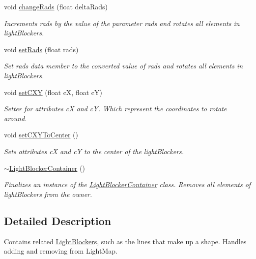 \begin{DoxyCompactItemize}
void \hyperlink{classlighting_1_1LightBlockerContainer_ae6e77185e27fce2e6bf22cdf61f88763}{change\+Rads} (float delta\+Rads)
\begin{DoxyCompactList}\small\item\em Increments rads by the value of the parameter {\itshape rads}  and rotates all elements in light\+Blockers. \end{DoxyCompactList}\item 
void \hyperlink{classlighting_1_1LightBlockerContainer_a9f9cb8e096967461019a2e58422a72de}{set\+Rads} (float rads)
\begin{DoxyCompactList}\small\item\em Set rads data member to the converted value of {\itshape rads}  and rotates all elements in light\+Blockers. \end{DoxyCompactList}\item 
void \hyperlink{classlighting_1_1LightBlockerContainer_a60ee568d8fac45f7ab2e2c5808323fa9}{set\+C\+XY} (float cX, float cY)
\begin{DoxyCompactList}\small\item\em Setter for attributes cX and cY. Which represent the coordinates to rotate around. \end{DoxyCompactList}\item 
void \hyperlink{classlighting_1_1LightBlockerContainer_aa16851b0673a85940dfc5efe79411bcd}{set\+C\+X\+Y\+To\+Center} ()
\begin{DoxyCompactList}\small\item\em Sets attributes cX and cY to the center of the light\+Blockers. \end{DoxyCompactList}\item 
\hyperlink{classlighting_1_1LightBlockerContainer_a37f1701797461e338a6622425c336376}{$\sim$\+Light\+Blocker\+Container} ()
\begin{DoxyCompactList}\small\item\em Finalizes an instance of the \hyperlink{classlighting_1_1LightBlockerContainer}{Light\+Blocker\+Container} class. Removes all elements of light\+Blockers from the owner. \end{DoxyCompactList}\end{DoxyCompactItemize}


\subsection{Detailed Description}
Contains related \hyperlink{classlighting_1_1LightBlocker}{Light\+Blocker}s, such as the lines that make up a shape. Handles adding and removing from Light\+Map. 



